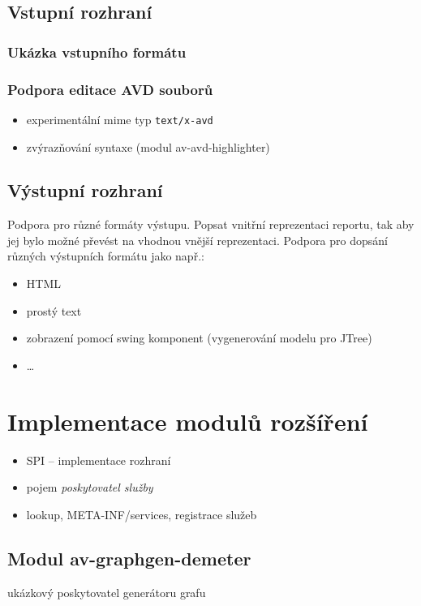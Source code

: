 \subsection{Vstupní rozhraní}
\subsubsection{Ukázka vstupního formátu}


\subsubsection{Podpora editace AVD souborů}
\begin{itemize}
\item experimentální mime typ \verb+text/x-avd+
\item zvýrazňování syntaxe (modul av-avd-highlighter)
\end{itemize}

\subsection{Výstupní rozhraní}
Podpora pro různé formáty výstupu. Popsat vnitřní reprezentaci reportu, tak aby jej bylo možné převést na vhodnou vnější reprezentaci. Podpora pro dopsání různých výstupních formátu jako např.:
\begin{itemize}
\item HTML
\item prostý text
\item zobrazení pomocí swing komponent (vygenerování modelu pro JTree)
\item \ldots
\end{itemize}

\section{Implementace modulů rozšíření}

\begin{itemize}
\item SPI -- implementace rozhraní
\item pojem \emph{poskytovatel služby}
\item lookup, META-INF/services, registrace služeb
\end{itemize}

\subsection{Modul av-graphgen-demeter}
ukázkový poskytovatel generátoru grafu

